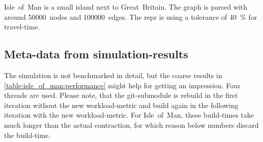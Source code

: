     Isle~of~Man is a small island next to Great~Britain.
    The graph is parsed with around \num{50000}~nodes and \num{100000}~edges.
    The \gls{repr} is using a tolerance of \si{40 \percent} for travel-time.

    \subsection{Meta-data from simulation-results}

        The simulation is not benchmarked in detail, but the coarse results in \vref{table:isle_of_man:performance} might help for getting an impression.
        Four threads are used.
        Please note, that the git-submodule is rebuild in the first iteration without the new workload-\gls{metric} and build again in the following iteration with the new workload-\gls{metric}.
        For Isle~of~Man, these build-times take much longer than the actual contraction, for which reason below numbers discard the build-time.
